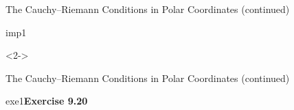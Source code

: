 \def\EMtitlesize{26}\def\EMtitleskip{31}
\begin{frame}{The Cauchy--Riemann Conditions in Polar Coordinates (continued)}
\begin{EMbox}{imp}{1}{}
\begin{uncoverenv}<2->
\end{uncoverenv}
\end{EMbox}
\end{frame}

\def\EMtitlesize{26}\def\EMtitleskip{31}
\begin{frame}{The Cauchy--Riemann Conditions in Polar Coordinates (continued)}
\begin{EMbox}{exe}{1}{\textbf{Exercise 9.20}}
\vspace{3bp}
\end{EMbox}
\end{frame}
